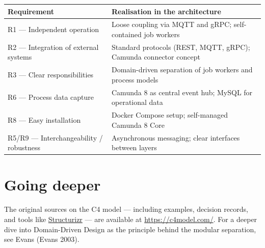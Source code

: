 \documentclass[
  english,
  11pt,
  a4paper,
]{scrbook}
\newcounter{none} %
\begin{document}
{\def\LTcaptype{none} %
\begin{longtable}[]{@{}
  >{\raggedright\arraybackslash}p{}
  >{\raggedright\arraybackslash}p{}@{}}
\toprule\noalign{}
\begin{minipage}[b]{\linewidth}\raggedright
Requirement
\end{minipage} & \begin{minipage}[b]{\linewidth}\raggedright
Realisation in the architecture
\end{minipage} \\
\midrule\noalign{}
\endhead
\bottomrule\noalign{}
\endlastfoot
R1 --- Independent operation & Loose coupling via MQTT and gRPC;
self-contained job workers \\
R2 --- Integration of external systems & Standard protocols (REST, MQTT,
gRPC); Camunda connector concept \\
R3 --- Clear responsibilities & Domain-driven separation of job workers
and process models \\
R6 --- Process data capture & Camunda 8 as central event hub; MySQL for
operational data \\
R8 --- Easy installation & Docker Compose setup; self-managed Camunda 8
Core \\
R5/R9 --- Interchangeability / robustness & Asynchronous messaging;
clear interfaces between layers \\
\end{longtable}
}

\section{Going deeper}\label{going-deeper}

\begin{tcolorbox}[enhanced jigsaw, arc=.35mm, bottomrule=.15mm, bottomtitle=1mm, breakable, colback=white, colbacktitle=quarto-callout-tip-color!10!white, colframe=quarto-callout-tip-color-frame, coltitle=black, left=2mm, leftrule=.75mm, opacityback=0, opacitybacktitle=0.6, rightrule=.15mm, title=\textcolor{quarto-callout-tip-color}{\faLightbulb}\hspace{0.5em}{Further reading}, titlerule=0mm, toprule=.15mm, toptitle=1mm]

The original sources on the C4 model --- including examples, decision
records, and tools like \href{https://structurizr.com/}{Structurizr} ---
are available at \url{https://c4model.com/}. For a deeper dive into
Domain-Driven Design as the principle behind the modular separation, see
Evans (Evans 2003).

\end{tcolorbox}
\end{document}
